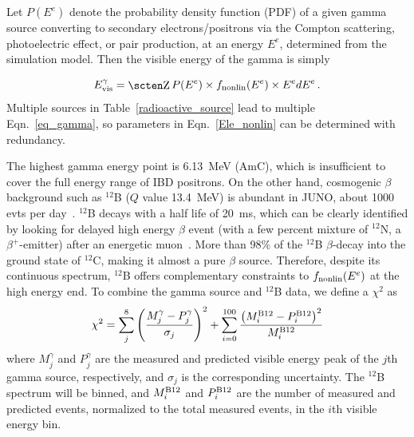 \documentclass[a4paper,10pt,twoside]{cpc-hepnp}
\begin{document}
\begin{CJK*}{GB}{gbsn}
\begin{multicols}{2}
Let $P(E^{e})$ denote the probability density function (PDF) of a
given gamma source converting to secondary electrons/positrons via the
Compton scattering, photoelectric effect, or pair production, at an
energy $E^{e}$, determined from the simulation model. Then the visible
energy of the gamma is simply

\begin{equation}
\label{eq_gamma}
E_{\rm vis}^{\gamma} = \int P(E^e)\times f_{\rm nonlin}(E^e) \times E^{e} dE^e\,.
\end{equation}
Multiple sources in Table~\ref{radioactive_source} lead to multiple
Eqn.~\ref{eq_gamma}, so parameters in Eqn.~\ref{Ele_nonlin} can be
determined with redundancy.

  The highest gamma energy point is 6.13~MeV (AmC),
  which is insufficient to cover the full energy range of IBD
  positrons. On the other hand, cosmogenic $\beta$ background such as
  $^{12}$B ($Q$ value 13.4~MeV) is abundant in JUNO, about 1000 evts
  per day~\cite{yellow-book}. $^{12}$B decays with a half life of
  20~ms, which can be clearly identified by looking for delayed high
  energy $\beta$ event (with a few percent mixture of $^{12}$N, a
  $\beta^{+}$-emitter) after an energetic
  muon~\cite{kamland-cosmogenic-bkg-paper}.  More than 98\% of the
  $^{12}$B $\beta$-decay into the ground state of $^{12}$C, making it
  almost a pure $\beta$ source. Therefore, despite its continuous
  spectrum, $^{12}$B offers complementary constraints to
  $f_{\rm nonlin}(E^e)$ at the high energy end.  To combine the gamma
  source and $^{12}$B data, we define a $\chi^{2}$ as
\begin{equation}
\label{eq_chi2}
\chi^{2}=\sum_{j}^{8}\left(\frac{M_{j}^{\gamma}-P_{j}^{\gamma}}{\sigma_{j}}\right)^{2}+\sum_{i=0}^{100} \frac{\left(M_{i}^{\rm B12}-P_{i}^{\rm B12}\right)^{2}}{M_{i}^{\rm B12}}
\end{equation}
where $M_{j}^{\gamma}$ and $P_{j}^{\gamma}$ are the measured and
predicted visible energy peak of the $j$th gamma source, respectively,
and $\sigma_{j}$ is the corresponding uncertainty. The $^{12}$B
spectrum will be binned, and $M_{i}^{\rm B12}$ and $P_{i}^{\rm B12}$
are the number of measured and predicted events, normalized to the
total measured events, in the $i$th visible energy bin.


\end{multicols}
\end{CJK*}
\end{document}
